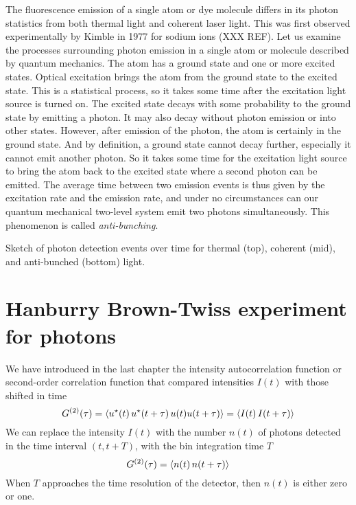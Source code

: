 The fluorescence emission of a single atom or dye molecule differs in its photon statistics from both thermal light and coherent laser light. This was first observed experimentally by Kimble in 1977 for sodium ions (XXX REF). Let us examine the processes surrounding photon emission in a single atom or molecule described by quantum mechanics. The atom has a ground state and one or more excited states. Optical excitation brings the atom from the ground state to the excited state. This is a statistical process, so it takes some time after the excitation light source is turned on. The excited state decays with some probability to the ground state by emitting a photon. It may also decay without photon emission or into other states. However, after emission of the photon, the atom is certainly in the ground state. And by definition, a ground state cannot decay further, especially it cannot emit another photon. So it takes some time for the excitation light source to bring the atom back to the excited state where a second photon can be emitted. The average time between two emission events is thus given by the excitation rate and the emission rate, and under no circumstances can our quantum mechanical two-level system emit two photons simultaneously. This phenomenon is called \emph{anti-bunching}.

\begin{marginfigure}
    \caption{Sketch of photon detection events over time for thermal (top), coherent (mid), and anti-bunched (bottom) light.}
\end{marginfigure}


\section{Hanburry Brown-Twiss experiment for photons}

We have introduced in the last chapter the intensity autocorrelation function or second-order correlation function that compared intensities $I(t)$ with those shifted in time
\begin{equation}
    G^{(2)}(\tau) = \braket{u^\star(t) \,  u^\star(t+\tau) \,  u( t) u( t + \tau)} 
    =  \braket{I(t) \,  I(t+\tau) } 
\end{equation}
We can replace the intensity $I(t)$ with the number $n(t)$ of photons detected in the time interval $(t, t+T)$, with the bin integration time $T$
\begin{equation}
    G^{(2)}(\tau)     =  \braket{n(t) \,  n(t+\tau) } 
\end{equation}
When $T$ approaches the time resolution of the detector, then $n(t)$ is either zero or one. 


